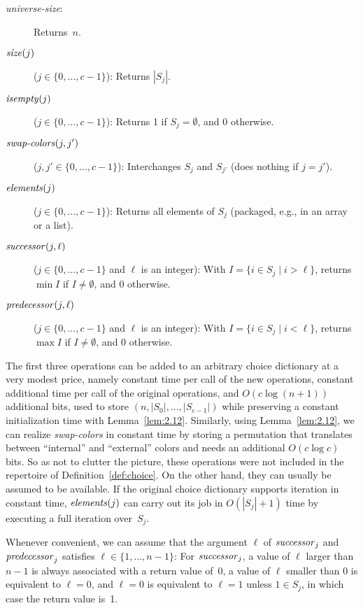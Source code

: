 \documentclass[envcountsame,envcountsect,undated,nolinenumbers]{lnthi}
\def\Tvn#1{\hbox{\textit{#1\/}}}
\begin{document}
\begin{description}
\item[\normalfont\Tvn{universe-size}:]
Returns~$n$.
\item[\normalfont$\Tvn{size}(j)$]
($j\in\{0,\ldots,c-1\}$):
Returns $|S_j|$.
\item[\normalfont$\Tvn{isempty}(j)$]
($j\in\{0,\ldots,c-1\}$):
Returns 1 if $S_j=\emptyset$, and 0 otherwise.
\item[\normalfont$\Tvn{swap-colors}(j,j')$]
($j,j'\in\{0,\ldots,c-1\}$):
Interchanges $S_j$ and $S_{j'}$ (does nothing
if $j=j'$).
\item[\normalfont$\Tvn{elements}(j)$]
($j\in\{0,\ldots,c-1\}$):
Returns all elements of $S_j$
(packaged, e.g., in an array or a list).
\item[\normalfont$\Tvn{successor}(j,\ell)$]
($j\in\{0,\ldots,c-1\}$ and $\ell$ is an integer):
With $I=\{i\in S_j\mid i>\ell\}$,
returns $\min I$ if $I\not=\emptyset$, and 0 otherwise.
\item[\normalfont$\Tvn{predecessor}(j,\ell)$]
($j\in\{0,\ldots,c-1\}$ and $\ell$ is an integer):
With $I=\{i\in S_j\mid i<\ell\}$,
returns $\max I$ if $I\not=\emptyset$, and 0 otherwise.
\end{description}

The first three operations can be added to an arbitrary
choice dictionary at a very modest price,
namely constant time per call of the new operations,
constant additional time per call of the
original operations, and
$O(c\log(n+1))$ additional bits, used to store
$(n,|S_0|,\ldots,|S_{c-1}|)$ while preserving a
constant initialization time with
Lemma~\ref{lem:2.12}.
Similarly, using Lemma~\ref{lem:2.12},
we can realize \Tvn{swap-colors} in constant time
by storing a permutation that translates
between ``internal'' and ``external'' colors
and needs an additional $O(c\log c)$ bits.
So as not to clutter the picture, these operations
were not included in the repertoire of
Definition~\ref{def:choice}.
On the other hand, they can usually be assumed
to be available.
If the original choice dictionary supports
iteration in constant time,
$\Tvn{elements}(j)$ can carry out its job
in $O(|S_j|+1)$ time by executing a full
iteration over~$S_j$.

Whenever convenient, we can assume that the
argument $\ell$ of $\Tvn{successor}_j$ and
$\Tvn{predecessor}_j$ satisfies $\ell\in\{1,\ldots,n-1\}$:
For $\Tvn{successor}_j$, a value of $\ell$ larger
than $n-1$ is always associated with a return value of~0,
a value of $\ell$ smaller than 0 is
equivalent to $\ell=0$, and $\ell=0$ is
equivalent to $\ell=1$ unless $1\in S_j$,
in which case the return value is~1.
\end{document}
